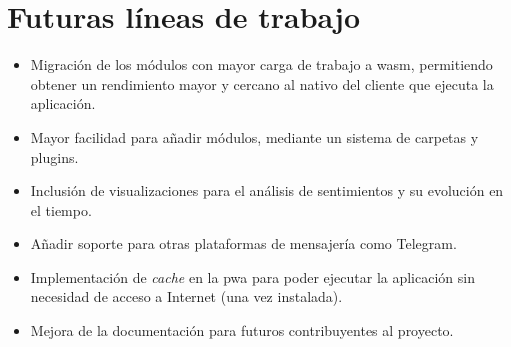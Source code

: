 \section{Futuras líneas de trabajo}
\label{sec:future-work}

\begin{itemize}

\item Migración de los módulos con mayor carga de trabajo a \acrfull{wasm}, permitiendo obtener un rendimiento mayor y cercano al nativo del cliente que ejecuta la aplicación.

\item Mayor facilidad para añadir módulos, mediante un sistema de carpetas y plugins.

\item Inclusión de visualizaciones para el análisis de sentimientos y su evolución en el tiempo.

\item Añadir soporte para otras plataformas de mensajería como Telegram.

\item Implementación de \textit{cache} en la \acrfull{pwa} para poder ejecutar la aplicación sin necesidad de acceso a Internet (una vez instalada).

\item Mejora de la documentación para futuros contribuyentes al proyecto.

\end{itemize}
